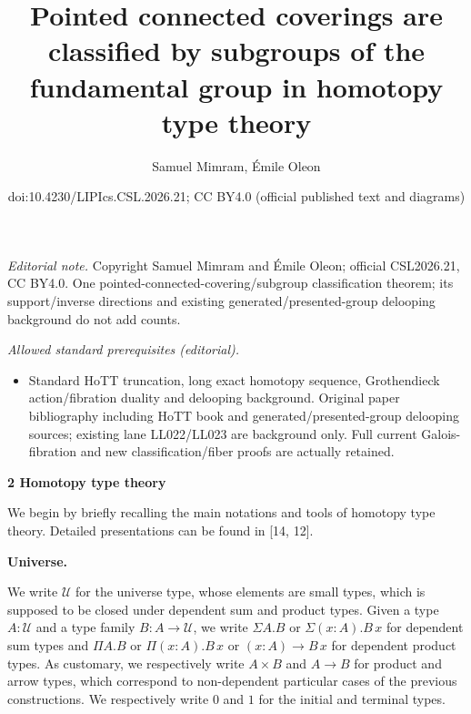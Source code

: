 \documentclass[10pt,a4paper]{article}
\title{Pointed connected coverings are classified by subgroups of the fundamental group in homotopy type theory}
\author{Samuel Mimram, Émile Oleon}
\date{doi:10.4230/LIPIcs.CSL.2026.21; CC BY4.0 (official published text and diagrams)}
\begin{document}
\maketitle
\noindent\textit{Editorial note.} Copyright Samuel Mimram and Émile Oleon; official CSL2026.21, CC BY4.0. One pointed-connected-covering/subgroup classification theorem; its support/inverse directions and existing generated/presented-group delooping background do not add counts.\par\medskip
\noindent\textit{Allowed standard prerequisites (editorial).}\begin{itemize}
\item Standard HoTT truncation, long exact homotopy sequence, Grothendieck action/fibration duality and delooping background. Original paper bibliography including HoTT book and generated/presented-group delooping sources; existing lane LL022/LL023 are background only. Full current Galois-fibration and new classification/fiber proofs are actually retained.
\end{itemize}\medskip

 
\par\medskip\noindent\textbf{2 Homotopy type theory}\par
 
 
We begin by briefly recalling the main notations and tools of homotopy type theory. Detailed presentations can be found in [14, 12].\par
 
 
 
\par\medskip\noindent\textbf{Universe.}\par
 
 
We write $\mathcal{U}$ for the universe type, whose elements are small types, which is supposed to be closed under dependent sum and product types. Given a type $A:\mathcal{U}$ and a type family $B:A\to\mathcal{U}$, we write $\Sigma A.B$ or $\Sigma(x:A).B\,x$ for dependent sum types and $\Pi A.B$ or $\Pi(x:A).B\,x$ or $(x:A)\to B\,x$ for dependent product types. As customary, we respectively write $A\times B$ and $A\to B$ for product and arrow types, which correspond to non-dependent particular cases of the previous constructions. We respectively write $0$ and $1$ for the initial and terminal types.\par
 
\end{document}
